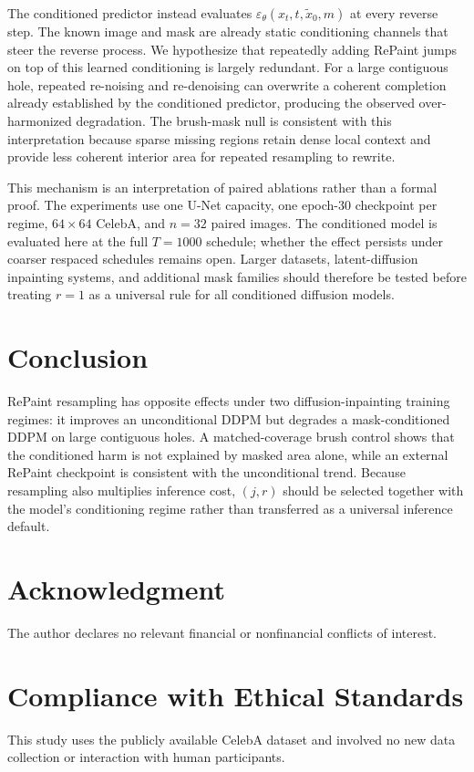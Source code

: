 \documentclass{article}
\begin{document}
The conditioned predictor instead evaluates
$\varepsilon_\theta(x_t,t,\tilde{x}_0,m)$ at every reverse step.
The known image and mask are already static conditioning channels that steer
the reverse process.
We hypothesize that repeatedly adding RePaint jumps on top of this learned
conditioning is largely redundant.
For a large contiguous hole, repeated re-noising and re-denoising can overwrite
a coherent completion already established by the conditioned predictor,
producing the observed over-harmonized degradation.
The brush-mask null is consistent with this interpretation because sparse
missing regions retain dense local context and provide less coherent interior
area for repeated resampling to rewrite.

This mechanism is an interpretation of paired ablations rather than a formal
proof.
The experiments use one U-Net capacity, one epoch-$30$ checkpoint per regime,
$64{\times}64$ CelebA, and $n{=}32$ paired images.
The conditioned model is evaluated here at the full $T{=}1000$ schedule;
whether the effect persists under coarser respaced schedules remains open.
Larger datasets, latent-diffusion inpainting systems, and additional mask
families should therefore be tested before treating $r{=}1$ as a universal
rule for all conditioned diffusion models.


\section{Conclusion}
\label{sec:conclusion}

RePaint resampling has opposite effects under two diffusion-inpainting training
regimes: it improves an unconditional DDPM but degrades a mask-conditioned DDPM
on large contiguous holes.
A matched-coverage brush control shows that the conditioned harm is not explained
by masked area alone, while an external RePaint checkpoint is consistent with
the unconditional trend.
Because resampling also multiplies inference cost, $(j,r)$ should be selected
together with the model's conditioning regime rather than transferred as a
universal inference default.


\section*{Acknowledgment}

The author declares no relevant financial or nonfinancial conflicts of interest.

\section*{Compliance with Ethical Standards}

This study uses the publicly available CelebA dataset and involved no new data
collection or interaction with human participants.




\end{document}
